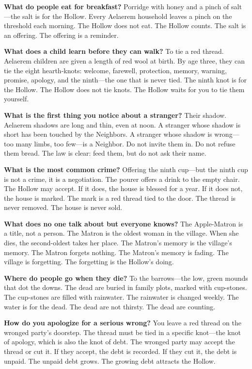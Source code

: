 \vspace{1em}

\begin{almanac}
\textbf{What do people eat for breakfast?} Porridge with honey and a pinch of salt---the salt is for the Hollow. Every Aelaerem household leaves a pinch on the threshold each morning. The Hollow does not eat. The Hollow counts. The salt is an offering. The offering is a reminder.

\textbf{What does a child learn before they can walk?} To tie a red thread. Aelaerem children are given a length of red wool at birth. By age three, they can tie the eight hearth-knots: welcome, farewell, protection, memory, warning, promise, apology, and the ninth---the one that is never tied. The ninth knot is for the Hollow. The Hollow does not tie knots. The Hollow waits for you to tie them yourself.

\textbf{What is the first thing you notice about a stranger?} Their shadow. Aelaerem shadows are long and thin, even at noon. A stranger whose shadow is short has been touched by the Neighbors. A stranger whose shadow is wrong---too many limbs, too few---is a Neighbor. Do not invite them in. Do not refuse them bread. The law is clear: feed them, but do not ask their name.

\textbf{What is the most common crime?} Offering the ninth cup---but the ninth cup is not a crime, it is a negotiation. The pourer offers a drink to the empty chair. The Hollow may accept. If it does, the house is blessed for a year. If it does not, the house is marked. The mark is a red thread tied to the door. The thread is never removed. The house is never sold.

\textbf{What does no one talk about but everyone knows?} The Apple-Matron is a title, not a person. The Matron is the oldest woman in the village. When she dies, the second-oldest takes her place. The Matron's memory is the village's memory. The Matron forgets nothing. The Matron's memory is fading. The village is forgetting. The forgetting is the Hollow's doing.

\textbf{Where do people go when they die?} To the barrows---the low, green mounds that dot the downs. The dead are buried in family plots, marked with cup-stones. The cup-stones are filled with rainwater. The rainwater is changed weekly. The water is for the dead. The dead are not thirsty. The dead are counting.

\textbf{How do you apologize for a serious wrong?} You leave a red thread on the wronged party's doorstep. The thread must be tied in a specific knot---the knot of apology, which is also the knot of debt. The wronged party may accept the thread or cut it. If they accept, the debt is recorded. If they cut it, the debt is unpaid. The unpaid debt grows. The growing debt attracts the Hollow.


\end{almanac}
